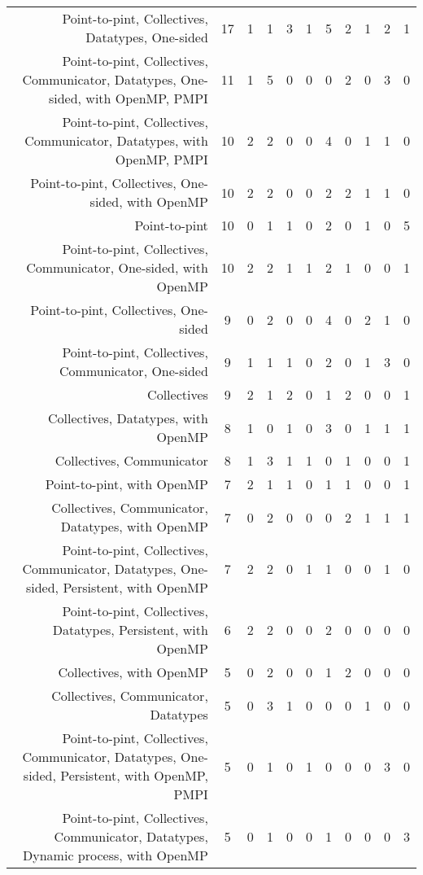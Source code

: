 {\begin{landscape}
\begin{longtable}[htb]{r|c|c|c|c|c|c|c|c|c|c}
{Point-to-pint, Collectives, Datatypes, One-sided} & 17 & 1 & 1 & 3 & 1 & 5 & 2 & 1 & 2 & 1 \\%
{Point-to-pint, Collectives, Communicator, Datatypes, One-sided, with OpenMP, PMPI} & 11 & 1 & 5 & 0 & 0 & 0 & 2 & 0 & 3 & 0 \\%
{Point-to-pint, Collectives, Communicator, Datatypes, with OpenMP, PMPI} & 10 & 2 & 2 & 0 & 0 & 4 & 0 & 1 & 1 & 0 \\%
{Point-to-pint, Collectives, One-sided, with OpenMP} & 10 & 2 & 2 & 0 & 0 & 2 & 2 & 1 & 1 & 0 \\%
{Point-to-pint} & 10 & 0 & 1 & 1 & 0 & 2 & 0 & 1 & 0 & 5 \\%
{Point-to-pint, Collectives, Communicator, One-sided, with OpenMP} & 10 & 2 & 2 & 1 & 1 & 2 & 1 & 0 & 0 & 1 \\%
{Point-to-pint, Collectives, One-sided} & 9 & 0 & 2 & 0 & 0 & 4 & 0 & 2 & 1 & 0 \\%
{Point-to-pint, Collectives, Communicator, One-sided} & 9 & 1 & 1 & 1 & 0 & 2 & 0 & 1 & 3 & 0 \\%
{Collectives} & 9 & 2 & 1 & 2 & 0 & 1 & 2 & 0 & 0 & 1 \\%
{Collectives, Datatypes, with OpenMP} & 8 & 1 & 0 & 1 & 0 & 3 & 0 & 1 & 1 & 1 \\%
{Collectives, Communicator} & 8 & 1 & 3 & 1 & 1 & 0 & 1 & 0 & 0 & 1 \\%
{Point-to-pint, with OpenMP} & 7 & 2 & 1 & 1 & 0 & 1 & 1 & 0 & 0 & 1 \\%
{Collectives, Communicator, Datatypes, with OpenMP} & 7 & 0 & 2 & 0 & 0 & 0 & 2 & 1 & 1 & 1 \\%
{Point-to-pint, Collectives, Communicator, Datatypes, One-sided, Persistent, with OpenMP} & 7 & 2 & 2 & 0 & 1 & 1 & 0 & 0 & 1 & 0 \\%
{Point-to-pint, Collectives, Datatypes, Persistent, with OpenMP} & 6 & 2 & 2 & 0 & 0 & 2 & 0 & 0 & 0 & 0 \\%
{Collectives, with OpenMP} & 5 & 0 & 2 & 0 & 0 & 1 & 2 & 0 & 0 & 0 \\%
{Collectives, Communicator, Datatypes} & 5 & 0 & 3 & 1 & 0 & 0 & 0 & 1 & 0 & 0 \\%
{Point-to-pint, Collectives, Communicator, Datatypes, One-sided, Persistent, with OpenMP, PMPI} & 5 & 0 & 1 & 0 & 1 & 0 & 0 & 0 & 3 & 0 \\%
{Point-to-pint, Collectives, Communicator, Datatypes, Dynamic process, with OpenMP} & 5 & 0 & 1 & 0 & 0 & 1 & 0 & 0 & 0 & 3 \\%

\end{longtable}
\end{landscape}}
